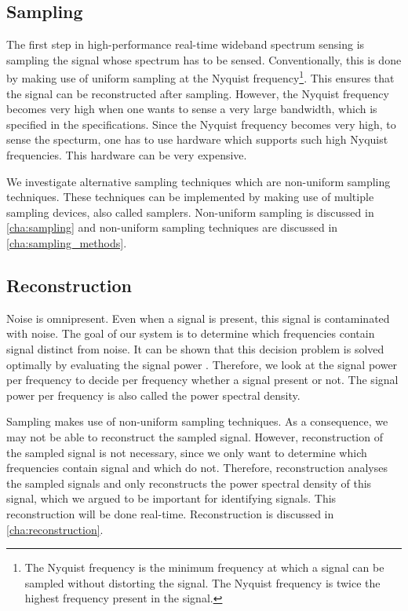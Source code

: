 \documentclass[a4paper, openany, oneside]{memoir}
\begin{document}
\subsection{Sampling}
The first step in high-performance real-time wideband spectrum sensing is sampling the signal whose spectrum has to be sensed. Conventionally, this is done by making use of uniform sampling at the Nyquist frequency\footnote{The Nyquist frequency is the minimum frequency at which a signal can be sampled without distorting the signal. The Nyquist frequency is twice the highest frequency present in the signal.}. This ensures that the signal can be reconstructed after sampling. However, the Nyquist frequency becomes very high when one wants to sense a very large bandwidth, which is specified in the specifications. Since the Nyquist frequency becomes very high, to sense the specturm, one has to use hardware which supports such high Nyquist frequencies. This hardware can be very expensive.

We investigate alternative sampling techniques which are non-uniform sampling techniques. These techniques can be implemented by making use of multiple sampling devices, also called samplers. Non-uniform sampling is discussed in \cref{cha:sampling} and non-uniform sampling techniques are discussed in \cref{cha:sampling_methods}.

\subsection{Reconstruction}
Noise is omnipresent. Even when a signal is present, this signal is contaminated with noise. The goal of our system is to determine which frequencies contain signal distinct from noise. It can be shown that this decision problem is solved optimally by evaluating the signal power \cite{axell2012spectrum}. Therefore, we look at the signal power per frequency to decide per frequency whether a signal present or not. The signal power per frequency is also called the power spectral density.

Sampling makes use of non-uniform sampling techniques. As a consequence, we may not be able to reconstruct the sampled signal. However, reconstruction of the sampled signal is not necessary, since we only want to determine which frequencies contain signal and which do not. Therefore, reconstruction analyses the sampled signals and only reconstructs the power spectral density of this signal, which we argued to be important for identifying signals. This reconstruction will be done real-time. Reconstruction is discussed in \cref{cha:reconstruction}.
\end{document}
